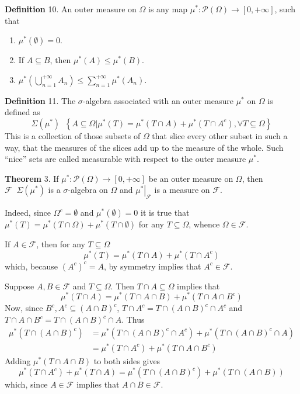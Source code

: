 \documentclass[a4paper]{article}
\newcommand{\obj}[1]{\left\{ #1 \right \}}
\newcommand{\clo}[1]{\left [ #1 \right ]}
\newcommand{\brac}[1]{\left ( #1 \right )}
\newcommand{\induc}[1]{\left . #1 \right \vert}
\newcommand{\Zinf}{\clo{ 0, +\infty }}
\newcommand{\Fcal}{\mathcal{F}}
\newcommand{\pwr}[1]{\mathcal{P}\brac{#1}}
\newcommand{\defn}{\mathop{\overset{\Delta}{=}}\nolimits}
\begin{document}
\noindent \textbf{Definition} 10.
An outer measure on $\Omega$ is any map $\mu^\ast:\pwr{\Omega}\to\Zinf$, such that\begin{enumerate}
	\item $\mu^\ast\brac{\emptyset} = 0$.
	\item If $A\subseteq B$, then $\mu^\ast\brac{A}\leq \mu^\ast\brac{B}$.
	\item $\mu^\ast\brac{\bigcup_{n=1}^{+\infty} A_n} \leq \sum_{n=1}^{+\infty} \mu^\ast\brac{A_n}$.
\end{enumerate}

\noindent \textbf{Definition} 11.
The $\sigma$-algebra associated with an outer measure $\mu^\ast$ on $\Omega$ is defined as \[\Sigma\brac{\mu^\ast} \defn \obj{ \induc{ A\subseteq \Omega } \mu^\ast\brac{T} = \mu^\ast\brac{T\cap A} + \mu^\ast\brac{T\cap A^c}, \forall T\subseteq \Omega }\] This is a collection of those subsets of $\Omega$ that slice every other subset in such a way, that the measures of the slices add up to the measure of the whole. Such ``nice'' sets are called measurable with respect to the outer measure $\mu^\ast$.

\label{thm:outermeasure_sigma_algebra} \noindent \textbf{Theorem} 3.
If $\mu^\ast:\pwr{\Omega}\to\Zinf$ be an outer measure on $\Omega$, then $\Fcal \defn \Sigma\brac{\mu^\ast}$ is a $\sigma$-algebra on $\Omega$ and $\induc{\mu^\ast}_\Fcal$ is a measure on $\Fcal$.

Indeed, since $\Omega^c=\emptyset$ and $\mu^\ast\brac{\emptyset}=0$ it is true that $\mu^\ast\brac{T} = \mu^\ast\brac{T\cap \Omega} + \mu^\ast\brac{T\cap \emptyset}$ for any $T\subseteq \Omega$, whence $\Omega\in \Fcal$.

If $A\in \Fcal$, then for any $T\subseteq\Omega$ \[\mu^\ast\brac{T} = \mu^\ast\brac{T\cap A} + \mu^\ast\brac{T\cap A^c}\] which, because $\brac{A^c}^c=A$, by symmetry implies that $A^c\in \Fcal$.

Suppose $A,B\in \Fcal$ and $T\subseteq\Omega$. Then $T\cap A\subseteq \Omega$ implies that \[\mu^\ast\brac{T\cap A } = \mu^\ast\brac{T\cap A \cap B} + \mu^\ast\brac{T\cap A \cap B^c}\] Now, since $B^c, A^c\subseteq \brac{A\cap B}^c$, $T\cap A^c = T \cap \brac{A\cap B}^c\cap A^c$ and $T\cap A\cap B^c = T \cap \brac{A\cap B}^c\cap A$. Thus\begin{align*}\mu^\ast\brac{T\cap \brac{A\cap B}^c}&=\mu^\ast\brac{T\cap \brac{A\cap B}^c \cap A^c} + \mu^\ast\brac{T\cap \brac{A\cap B}^c\cap A}\\&=\mu^\ast\brac{T\cap A^c} + \mu^\ast\brac{T\cap A\cap B^c}\end{align*} Adding $\mu^\ast\brac{T\cap A\cap B}$ to both sides gives\[\mu^\ast\brac{T\cap A^c} + \mu^\ast\brac{T\cap A} = \mu^\ast\brac{T\cap\brac{A\cap B}^c}+\mu^\ast\brac{T\cap\brac{A\cap B}}\] which, since $A\in \Fcal$ implies that $A\cap B\in \Fcal$.
\end{document}
